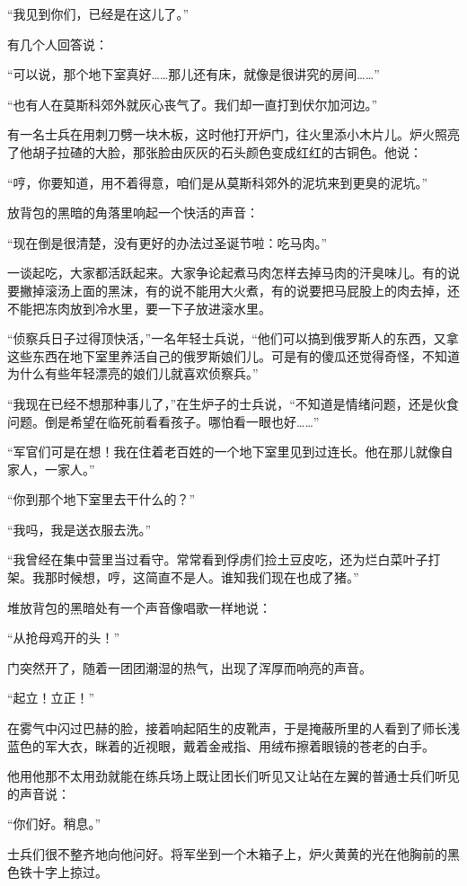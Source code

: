 “我见到你们，已经是在这儿了。”

有几个人回答说：

“可以说，那个地下室真好……那儿还有床，就像是很讲究的房间……”

“也有人在莫斯科郊外就灰心丧气了。我们却一直打到伏尔加河边。”

有一名士兵在用刺刀劈一块木板，这时他打开炉门，往火里添小木片儿。炉火照亮了他胡子拉碴的大脸，那张脸由灰灰的石头颜色变成红红的古铜色。他说：

“哼，你要知道，用不着得意，咱们是从莫斯科郊外的泥坑来到更臭的泥坑。”

放背包的黑暗的角落里响起一个快活的声音：

“现在倒是很清楚，没有更好的办法过圣诞节啦：吃马肉。”

一谈起吃，大家都活跃起来。大家争论起煮马肉怎样去掉马肉的汗臭味儿。有的说要撇掉滚汤上面的黑沫，有的说不能用大火煮，有的说要把马屁股上的肉去掉，还不能把冻肉放到冷水里，要一下子放进滚水里。

“侦察兵日子过得顶快活，”一名年轻士兵说，“他们可以搞到俄罗斯人的东西，又拿这些东西在地下室里养活自己的俄罗斯娘们儿。可是有的傻瓜还觉得奇怪，不知道为什么有些年轻漂亮的娘们儿就喜欢侦察兵。”

“我现在已经不想那种事儿了，”在生炉子的士兵说，“不知道是情绪问题，还是伙食问题。倒是希望在临死前看看孩子。哪怕看一眼也好……”

“军官们可是在想！我在住着老百姓的一个地下室里见到过连长。他在那儿就像自家人，一家人。”

“你到那个地下室里去干什么的？”

“我吗，我是送衣服去洗。”

“我曾经在集中营里当过看守。常常看到俘虏们捡土豆皮吃，还为烂白菜叶子打架。我那时候想，哼，这简直不是人。谁知我们现在也成了猪。”

堆放背包的黑暗处有一个声音像唱歌一样地说：

“从抢母鸡开的头！”

门突然开了，随着一团团潮湿的热气，出现了浑厚而响亮的声音。

“起立！立正！”

在雾气中闪过巴赫的脸，接着响起陌生的皮靴声，于是掩蔽所里的人看到了师长浅蓝色的军大衣，眯着的近视眼，戴着金戒指、用绒布擦着眼镜的苍老的白手。

他用他那不太用劲就能在练兵场上既让团长们听见又让站在左翼的普通士兵们听见的声音说：

“你们好。稍息。”

士兵们很不整齐地向他问好。将军坐到一个木箱子上，炉火黄黄的光在他胸前的黑色铁十字上掠过。

